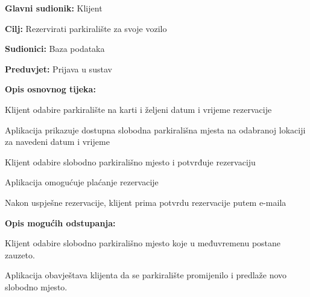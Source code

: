 \noindent {}
\begin{packed_item}
	
	\item \textbf{Glavni sudionik: }Klijent
	\item  \textbf{Cilj:} Rezervirati parkiralište za svoje vozilo
	\item  \textbf{Sudionici:} Baza podataka
	\item  \textbf{Preduvjet:} Prijava u sustav
	\item  \textbf{Opis osnovnog tijeka:}
	
	\item[] \begin{packed_enum}
		
		\item Klijent odabire parkiralište na karti i željeni datum i vrijeme rezervacije
		\item Aplikacija prikazuje dostupna slobodna parkirališna mjesta na odabranoj lokaciji za navedeni datum i vrijeme
		\item Klijent odabire slobodno parkirališno mjesto i potvrđuje rezervaciju
		\item Aplikacija omogućuje plaćanje rezervacije
		\item Nakon uspješne rezervacije, klijent prima potvrdu rezervacije putem e-maila
		
	\end{packed_enum}
	
	\item  \textbf{Opis mogućih odstupanja:}
	
	\item[] \begin{packed_item}
		
		\item[3.a] Klijent odabire slobodno parkirališno mjesto koje u međuvremenu postane zauzeto.
		\item[] \begin{packed_enum}
			
			\item Aplikacija obavještava klijenta da se parkiralište promijenilo i predlaže novo slobodno mjesto.
			
		\end{packed_enum}
		
	\end{packed_item}

\end{packed_item}

